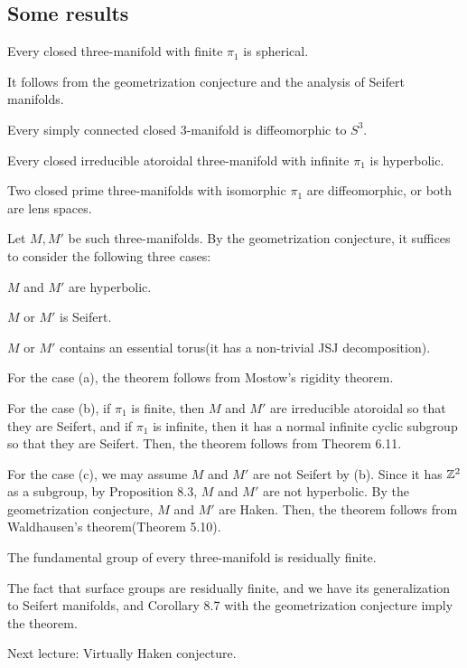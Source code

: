 \documentclass{../../../small}
\begin{document}
\subsection{Some results}
\begin{thm}
Every closed three-manifold with finite $\pi_1$ is spherical.
\end{thm}
\begin{pf}
It follows from the geometrization conjecture and the analysis of Seifert manifolds.
\end{pf}
\begin{thm}
Every simply connected closed 3-manifold is diffeomorphic to $S^3$.
\end{thm}
\begin{thm}
Every closed irreducible atoroidal three-manifold with infinite $\pi_1$ is hyperbolic.
\end{thm}
\begin{thm}
Two closed prime three-manifolds with isomorphic $\pi_1$ are diffeomorphic, or both are lens spaces.
\end{thm}
\begin{pf}
Let $M,M'$ be such three-manifolds.
By the geometrization conjecture, it suffices to consider the following three cases:
\begin{parts}
\item $M$ and $M'$ are hyperbolic.
\item $M$ or $M'$ is Seifert.
\item $M$ or $M'$ contains an essential torus(it has a non-trivial JSJ decomposition).
\end{parts}

For the case (a), the theorem follows from Mostow's rigidity theorem.

For the case (b), if $\pi_1$ is finite, then $M$ and $M'$ are irreducible atoroidal so that they are Seifert, and if $\pi_1$ is infinite, then it has a normal infinite cyclic subgroup so that they are Seifert.
Then, the theorem follows from Theorem 6.11.

For the case (c), we may assume $M$ and $M'$ are not Seifert by (b).
Since it has $\mathbb{Z}^2$ as a subgroup, by Proposition 8.3, $M$ and $M'$ are not hyperbolic.
By the geometrization conjecture, $M$ and $M'$ are Haken.
Then, the theorem follows from Waldhausen's theorem(Theorem 5.10).
\end{pf}

\begin{thm}
The fundamental group of every three-manifold is residually finite.
\end{thm}
The fact that surface groups are residually finite, and we have its generalization to Seifert manifolds, and Corollary 8.7 with the geometrization conjecture imply the theorem.


Next lecture: Virtually Haken conjecture.
\end{document}
